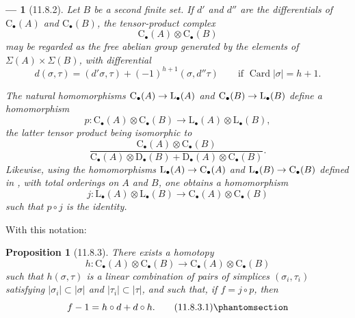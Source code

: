 \documentclass[oneside]{amsart}
\theoremstyle{ega-env-style}
\newtheorem*{env}{---}
\theoremstyle{ega-thm-env-style}
\newtheorem*{proposition}{Proposition}
\theoremstyle{ega-defn-env-style}
\renewcommand{\to}{\mathchoice{\longrightarrow}{\rightarrow}{\rightarrow}{\rightarrow}}
\newcommand{\oldpage}[2][]{{\marginnote{\normalfont{\textbf{#1}~|~#2}}}\ignorespaces}
\let\EGAOriginalLabel\label
\renewcommand{\label}[1]{\phantomsection\EGAOriginalLabel{#1}}
\begin{document}
\begin{env}[11.8.2]
\label{0.11.8.2}
Let $B$ be a second finite set.
If $d'$ and $d''$ are the differentials of
$\mathrm{C}_\bullet(A)$ and $\mathrm{C}_\bullet(B)$, the tensor-product
complex
\[
  \mathrm{C}_\bullet(A)\otimes\mathrm{C}_\bullet(B)
\]
may be regarded as the free abelian group generated by the elements of
$\Sigma(A)\times\Sigma(B)$, with differential
\[
  d(\sigma,\tau)
  =
  (d'\sigma,\tau)+(-1)^{h+1}(\sigma,d''\tau)
  \qquad\text{if }\operatorname{Card}|\sigma|=h+1.
\]

The natural homomorphisms
$\mathrm{C}_\bullet(A)\to\mathrm{L}_\bullet(A)$ and
$\mathrm{C}_\bullet(B)\to\mathrm{L}_\bullet(B)$ define a homomorphism
\[
  p:
  \mathrm{C}_\bullet(A)\otimes\mathrm{C}_\bullet(B)
  \longrightarrow
  \mathrm{L}_\bullet(A)\otimes\mathrm{L}_\bullet(B),
\]
the latter tensor product being isomorphic to
\[
  \frac{\mathrm{C}_\bullet(A)\otimes\mathrm{C}_\bullet(B)}
  {\mathrm{C}_\bullet(A)\otimes\mathrm{D}_\bullet(B)
   +\mathrm{D}_\bullet(A)\otimes\mathrm{C}_\bullet(B)}.
\]
Likewise, using the homomorphisms
$\mathrm{L}_\bullet(A)\to\mathrm{C}_\bullet(A)$ and
$\mathrm{L}_\bullet(B)\to\mathrm{C}_\bullet(B)$ defined in
, with total orderings on $A$ and $B$, one obtains a
homomorphism
\[
  j:
  \mathrm{L}_\bullet(A)\otimes\mathrm{L}_\bullet(B)
  \longrightarrow
  \mathrm{C}_\bullet(A)\otimes\mathrm{C}_\bullet(B)
\]
such that $p\circ j$ is the identity.
\end{env}

\oldpage[0\textsubscript{III}]{44}
With this notation:
\begin{proposition}[11.8.3]
\label{0.11.8.3}
There exists a homotopy
\[
  h:
  \mathrm{C}_\bullet(A)\otimes\mathrm{C}_\bullet(B)
  \longrightarrow
  \mathrm{C}_\bullet(A)\otimes\mathrm{C}_\bullet(B)
\]
such that $h(\sigma,\tau)$ is a linear combination of pairs of simplices
$(\sigma_i,\tau_i)$ satisfying
$|\sigma_i|\subset|\sigma|$ and $|\tau_i|\subset|\tau|$, and such that,
if $f=j\circ p$, then
\[
  f-1=h\circ d+d\circ h.
  \tag{11.8.3.1}\label{0.11.8.3.1}
\]
\end{proposition}
\end{document}
